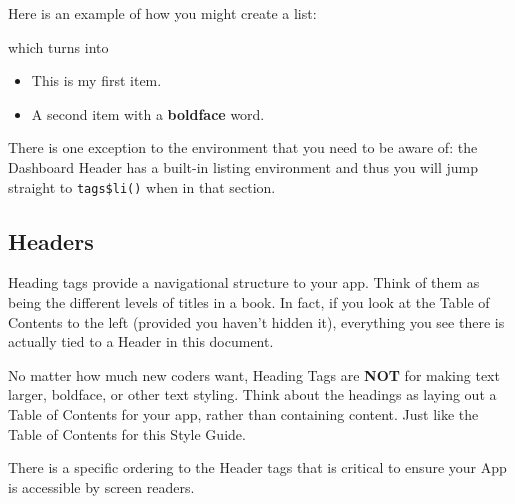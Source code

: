 \documentclass[
]{book}
\newenvironment{Shaded}{\begin{snugshade}}{\end{snugshade}}
\newcommand{\KeywordTok}[1]{\textcolor[rgb]{0.13,0.29,0.53}{\textbf{#1}}}
\newcommand{\NormalTok}[1]{#1}
\newcommand{\OperatorTok}[1]{\textcolor[rgb]{0.81,0.36,0.00}{\textbf{#1}}}
\newcommand{\StringTok}[1]{\textcolor[rgb]{0.31,0.60,0.02}{#1}}
\providecommand{\tightlist}{%
  \setlength{\itemsep}{0pt}\setlength{\parskip}{0pt}}
\begin{document}
Here is an example of how you might create a list:

\begin{Shaded}
\end{Shaded}

which turns into

\begin{itemize}
\tightlist
\item
  This is my first item.
\item
  A second item with a \textbf{boldface} word.
\end{itemize}

There is one exception to the environment that you need to be aware of: the Dashboard Header has a built-in listing environment and thus you will jump straight to \texttt{tags\$li()} when in that section.

\hypertarget{headersb}{%
\subsection{Headers}\label{headersb}}

Heading tags provide a navigational structure to your app. Think of them as being the different levels of titles in a book. In fact, if you look at the Table of Contents to the left (provided you haven't hidden it), everything you see there is actually tied to a Header in this document.

No matter how much new coders want, Heading Tags are \textbf{NOT} for making text larger, boldface, or other text styling. Think about the headings as laying out a Table of Contents for your app, rather than containing content. Just like the Table of Contents for this Style Guide.

There is a specific ordering to the Header tags that is critical to ensure your App is accessible by screen readers.
\end{document}
